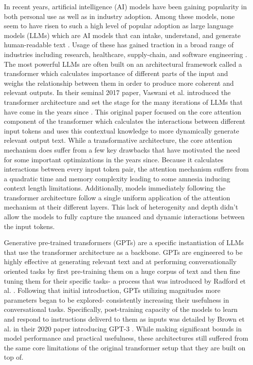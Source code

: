 In recent years, artificial intelligence (AI) models have been gaining popularity in both personal use 
as well as in industry adoption. Among these models, none seem to have risen to such a high level of 
popular adoption as large language models (LLMs) which are AI models that can intake, understand, and generate
human-readable text \cite{brown2020languagemodelsfewshotlearners}. Usage of these has gained traction in a broad 
range of industries including 
research, healthcare, supply-chain, and software engineering 
\cite {liang2024mappingincreasingusellms} \cite{ZHANG2025102883} \cite{urlana2024llmsindustriallensdeciphering}. 
The most powerful LLMs are often built on 
an architectural framework called a transformer which calculates importance of different parts of the input and weighs 
the relationship between them in order to produce more coherent and relevant outputs.
In their seminal 2017 paper, Vaswani et al. introduced the 
transformer architecture and set the stage for the many iterations of LLMs that 
have come in the years since \cite{vaswani2023attentionneed}. This original paper focused on the core attention 
component of the transformer which calculates the interactions between different
input tokens and uses this contextual knowledge to more dynamically generate 
relevant output text. While a transformative architecture, the core attention mechanism does suffer from 
a few key drawbacks that have motivated the need for some important optimizations in the years since. 
Because it calculates interactions between every input token pair, the attention mechanism suffers from 
a quadratic time and memory complexity leading to some amnesia inducing context length limitations. Additionally, 
models immediately following the transformer architecture follow a single uniform application of the attention 
mechanism at their different layers. This lack of heterogenity and depth didn't allow the models to 
fully capture the nuanced and dynamic interactions between the input tokens.

Generative pre-trained transformers (GPTs) are a specific instantiation of LLMs that use the transformer architecture as a backbone. 
GPTs are engineered to be highly effective at generating relevant text and at performing 
conversationally oriented tasks by first pre-training them on a huge corpus of text and then fine tuning
them for their specific tasks- a process that was introduced by Radford et al. \cite{radford2018improving}. Following 
that initial introduction, GPTs utilizing magnitudes more parameters began to be explored- consistently
increasing their usefulness in conversational tasks. Specifically, post-training capacity of the 
models to learn and respond to instructions deliverd to them as inputs was detailed by Brown et al. in their 
2020 paper introducing GPT-3 \cite{brown2020languagemodelsfewshotlearners}. 
While making significant bounds in model performance and practical usefulness, these architectures still 
suffered from the same core limitations of the original transformer setup that they are built on top of. 

